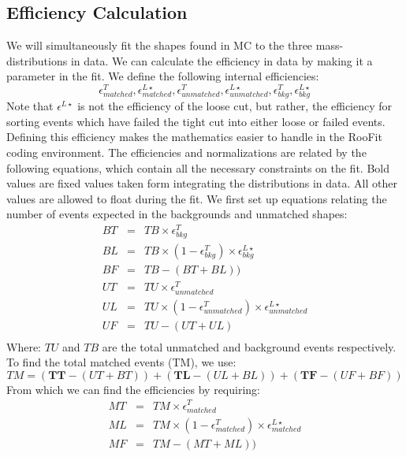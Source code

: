 \subsection{Efficiency Calculation}
We will simultaneously fit the shapes found in MC to the three mass-distributions in data. We can calculate the efficiency in data by making it a parameter in the fit. 
We define the following internal efficiencies: 
\begin{equation}
\epsilon^T_{matched},\epsilon^{L\star}_{matched},\epsilon^T_{unmatched}, \epsilon^{L\star}_{unmatched}, \epsilon^T_{bkg}, \epsilon^{L\star}_{bkg}
\end{equation}
Note that $\epsilon^{L\star}$ is not the efficiency of the loose cut, but rather, the efficiency for sorting events which have failed the tight cut into either loose or failed events. Defining this efficiency makes the mathematics easier to handle in the RooFit coding environment. 
The efficiencies and normalizations are related by the following equations, which contain all the necessary constraints on the fit. Bold values are fixed values taken form integrating the distributions in data. All other values are allowed to float during the fit.
We first set up equations relating the number of events expected in the backgrounds and unmatched shapes:
\begin{eqnarray}
BT & = & TB\times \epsilon^T_{bkg}\\
BL & = & TB\times (1 - \epsilon^T_{bkg}) \times \epsilon^{L\star}_{bkg}\\
BF & = & TB - (BT + BL)) \\
UT & = & TU\times \epsilon^T_{unmatched}\\
UL & = & TU\times (1 - \epsilon^T_{unmatched}) \times \epsilon^{L\star}_{unmatched}\\
UF & = & TU - (UT + UL) \\
\end{eqnarray}
Where: $TU$ and $TB$ are the total unmatched and background events respectively. To find the total matched events (TM), we use:
\begin{equation}
TM = (\textbf{TT}- (UT + BT)) + (\textbf{TL}- (UL + BL)) + (\textbf{TF}- (UF + BF))
\end{equation}
From which we can find the efficiencies by requiring:
\begin{eqnarray}
MT & = & TM\times \epsilon^T_{matched}\\
ML & = & TM\times (1 - \epsilon^T_{matched}) \times \epsilon^{L\star}_{matched}\\
MF & = & TM - (MT + ML)) \\
\end{eqnarray}
\clearpage
